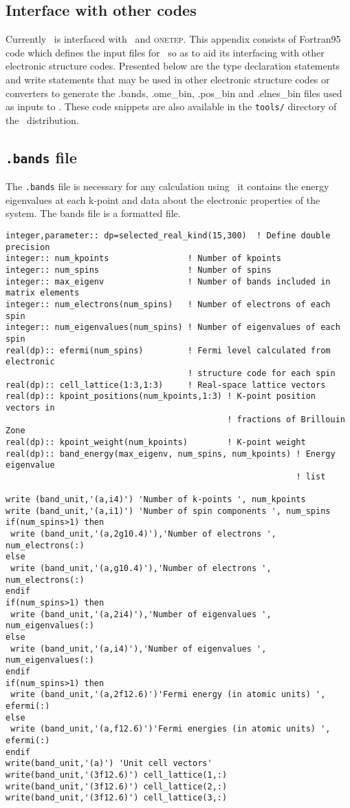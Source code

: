 \documentclass[a4paper,11pt,twoside]{book}
\begin{document}
{\begin{appendix}

\chapter{Interface with other codes}
Currently \optados\ is interfaced with \castep\ and \textsc{onetep}.
%
This appendix consists of Fortran95 code which defines the input files for \optados\ so as to aid its interfacing with other electronic structure codes.
%
Presented below are the type declaration statements and write statements that may be used in other electronic structure codes or converters to generate the .bands, .ome\_bin, .pos\_bin and .elnes\_bin files used as inputs to \optados.
%
These code snippets are also available in the \texttt{tools/} directory of the \optados\ distribution.

\section{\texttt{.bands} file}
The \texttt{.bands} file is necessary for any calculation using \optados\ it contains the energy eigenvalues at each k-point and data about the electronic properties of the system.
%
The bands file is a formatted file.
\begin{verbatim}
integer,parameter:: dp=selected_real_kind(15,300)  ! Define double precision
integer:: num_kpoints                ! Number of kpoints
integer:: num_spins                  ! Number of spins
integer:: max_eigenv                 ! Number of bands included in matrix elements
integer:: num_electrons(num_spins)   ! Number of electrons of each spin
integer:: num_eigenvalues(num_spins) ! Number of eigenvalues of each spin
real(dp):: efermi(num_spins)         ! Fermi level calculated from electronic
                                     ! structure code for each spin
real(dp):: cell_lattice(1:3,1:3)     ! Real-space lattice vectors
real(dp):: kpoint_positions(num_kpoints,1:3) ! K-point position vectors in
                                             ! fractions of Brillouin Zone
real(dp):: kpoint_weight(num_kpoints)        ! K-point weight
real(dp):: band_energy(max_eigenv, num_spins, num_kpoints) ! Energy eigenvalue
                                                           ! list

write (band_unit,'(a,i4)') 'Number of k-points ', num_kpoints
write (band_unit,'(a,i1)') 'Number of spin components ', num_spins
if(num_spins>1) then
 write (band_unit,'(a,2g10.4)'),'Number of electrons ', num_electrons(:)
else
 write (band_unit,'(a,g10.4)'),'Number of electrons ', num_electrons(:)
endif
if(num_spins>1) then
 write (band_unit,'(a,2i4)'),'Number of eigenvalues ', num_eigenvalues(:)
else
 write (band_unit,'(a,i4)'),'Number of eigenvalues ', num_eigenvalues(:)
endif
if(num_spins>1) then
 write (band_unit,'(a,2f12.6)')'Fermi energy (in atomic units) ', efermi(:)
else
 write (band_unit,'(a,f12.6)')'Fermi energies (in atomic units) ', efermi(:)
endif
write(band_unit,'(a)') 'Unit cell vectors'
write(band_unit,'(3f12.6)') cell_lattice(1,:)
write(band_unit,'(3f12.6)') cell_lattice(2,:)
write(band_unit,'(3f12.6)') cell_lattice(3,:)


\end{verbatim}
\end{appendix}}
\end{document}
